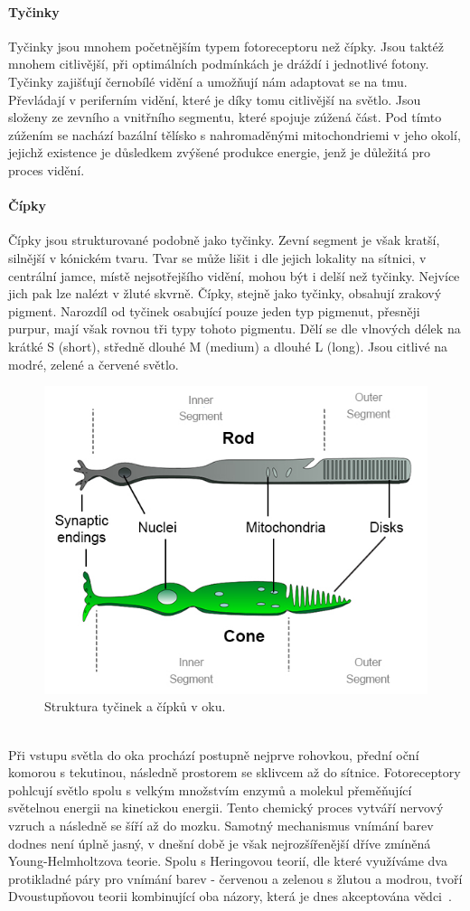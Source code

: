 \paragraph{Tyčinky}
Tyčinky jsou mnohem početnějším typem fotoreceptoru než čípky. Jsou taktéž mnohem citlivější, při optimálních podmínkách je dráždí i jednotlivé
fotony. Tyčinky zajišťují černobílé vidění a umožňují nám adaptovat se na tmu. Převládají v periferním vidění, které je díky tomu citlivější na světlo.
Jsou složeny ze zevního a vnitřního segmentu, které spojuje zúžená část. Pod tímto zúžením se nachází bazální tělísko s nahromaděnými mitochondriemi
v jeho okolí, jejichž existence je důsledkem zvýšené produkce energie, jenž je důležitá pro proces vidění. 

\paragraph{Čípky}
Čípky jsou strukturované podobně jako tyčinky. Zevní segment je však kratší, silnější v kónickém tvaru.
Tvar se může lišit i dle jejich lokality na sítnici, v centrální jamce, místě nejsotřejšího vidění, mohou být i delší než tyčinky. Nejvíce jich pak lze nalézt v 
žluté skvrně. Čípky, stejně jako tyčinky, obsahují zrakový pigment. Narozdíl od tyčinek osabující pouze jeden typ pigmenut, přesněji purpur,
mají však rovnou tři typy tohoto pigmentu. Dělí se dle vlnových délek na krátké S (short), středně dlouhé M (medium) a dlouhé L (long). Jsou citlivé na modré, zelené a červené světlo. 
\\
\begin{figure}[!ht]
    \centering
    \includegraphics[width=0.6\linewidth]{images/rods-cones.jpg}
    \caption{Struktura tyčinek a čípků v oku.~\cite{RodsAndCones}}
    \label{fig:Tyčinky a čípky}
\end{figure}
\\
Při vstupu světla do oka prochází postupně nejprve rohovkou, přední oční komorou s tekutinou, následně prostorem se sklivcem až do sítnice. Fotoreceptory pohlcují světlo
spolu s velkým množstvím enzymů a molekul přeměňující světelnou energii na kinetickou energii. Tento chemický proces vytváří nervový vzruch a následně se šíří až do mozku.
Samotný mechanismus vnímání barev dodnes není úplně jasný, v dnešní době je však nejrozšířenější dříve zmíněná Young-Helmholtzova teorie. Spolu s Heringovou teorií, dle které
využíváme dva protikladné páry pro vnímání barev - červenou a zelenou s žlutou a modrou, tvoří
Dvoustupňovou teorii kombinující oba názory, která je dnes akceptována vědci~\cite{soukup2020}.

